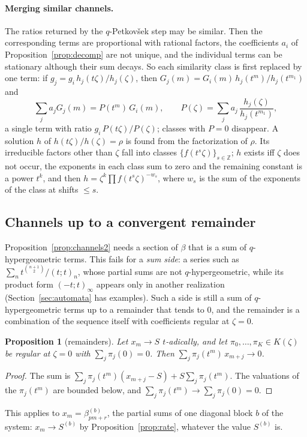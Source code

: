 \documentclass[11pt,a4paper]{article}
\theoremstyle{plain}
\newtheorem{proposition}[theorem]{Proposition}
\theoremstyle{definition}
\theoremstyle{remark}
\begin{document}
\paragraph{Merging similar channels.} The ratios returned by the
$q$-Petkov\v{s}ek step may be similar. Then the corresponding terms are
proportional with rational factors, the coefficients $a_i$ of
Proposition~\ref{prop:decomp} are not unique, and the individual terms can be
stationary although their sum decays. So each similarity class is first
replaced by one term: if $g_j=g_i\,h_j(t\zeta)/h_j(\zeta)$, then
$G_j(m)=G_i(m)\,h_j(t^m)/h_j(t^{m_1})$ and
\[
  \sum_ja_jG_j(m)=P(t^m)\,G_i(m),\qquad
  P(\zeta)=\sum_ja_j\,\frac{h_j(\zeta)}{h_j(t^{m_1})},
\]
a single term with ratio $g_i\,P(t\zeta)/P(\zeta)$; classes with $P=0$ disappear.
A solution $h$ of $h(t\zeta)/h(\zeta)=\rho$ is found from the factorization of
$\rho$. Its irreducible factors other than $\zeta$ fall into classes
$\{f(t^s\zeta)\}_{s\in\mathbb Z}$; $h$ exists iff $\zeta$ does not occur, the
exponents in each class sum to zero and the remaining constant is a power
$t^k$, and then $h=\zeta^k\prod f(t^s\zeta)^{-w_s}$, where $w_s$ is the sum of the
exponents of the class at shifts $\le s$.

\subsection{Channels up to a convergent remainder}\label{sec:remainders}
Proposition~\ref{prop:channels2} needs a section of $\beta$ that is a sum of
$q$-hypergeometric terms. This fails for a \emph{sum side}: a series such as
$\sum_nt^{\binom{n+1}2}/(t;t)_n$, whose partial sums are not
$q$-hypergeometric, while its product form $(-t;t)_\infty$ appears only in
another realization (Section~\ref{sec:automata} has examples). Such a side is
still a sum of $q$-hypergeometric terms up to a remainder that tends to $0$, and
the remainder is a combination of the sequence itself with coefficients
regular at $\zeta=0$.

\begin{proposition}[remainders]\label{prop:remainder}
Let $x_m\to S$ $t$-adically, and let $\pi_0,\dots,\pi_K\in K(\zeta)$ be regular
at $\zeta=0$ with $\sum_j\pi_j(0)=0$. Then $\sum_j\pi_j(t^m)\,x_{m+j}\to0$.
\end{proposition}
\begin{proof}
The sum is $\sum_j\pi_j(t^m)(x_{m+j}-S)+S\sum_j\pi_j(t^m)$. The valuations of
the $\pi_j(t^m)$ are bounded below, and $\sum_j\pi_j(t^m)\to\sum_j\pi_j(0)=0$.
\end{proof}
This applies to $x_m=\beta^{(b)}_{pm+r}$, the partial sums of one diagonal block
$b$ of the system: $x_m\to S^{(b)}$ by Proposition~\ref{prop:rate}, whatever the
value $S^{(b)}$ is.
\end{document}

